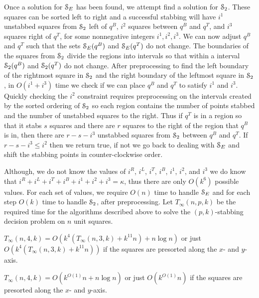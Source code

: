 \documentclass[11pt]{myclass}
\newcommand{\EuS}{\ensuremath{\EuScript{S}}}
\begin{document}
Once a solution for $\EuS_E$ has been found, we attempt find a solution for $\EuS_2$.  These squares can be sorted left to right and a successful stabbing will have $i^1$ unstabbed squares from $\EuS_2$ left of $q^B$, $i^2$ squares between $q^B$ and $q^T$, and $i^3$ squares right of $q^T$, for some nonnegative integers $i^1, i^2, i^3$.  We can now adjust $q^B$ and $q^T$ such that the sets $\EuS_E(q^B)$ and $\EuS_E(q^T)$ do not change.  The boundaries of the squares from $\EuS_2$ divide the regions into intervals so that within a interval $\EuS_2(q^B)$ and $\EuS_2(q^T)$ do not change.  After preprocessing to find the left boundary of the rightmost square in $\EuS_2$ and the right boundary of the leftmost square in $\EuS_2$, in $O(i^1 + i^3)$ time we check if we can place $q^B$ and $q^T$ to satisfy $i^1$ and $i^3$.  
Quickly checking the $i^2$ constraint requires preprocessing on the intervals created by the sorted ordering of $\EuS_2$ so each region contains the number of points stabbed and the number of unstabbed squares to the right.  Thus if $q^T$ is in a region so that it stabs $s$ squares and there are $r$ squares to the right of the region that $q^B$ is in, then there are $r - s - i^3$ unstabbed squares from $\EuS_2$ between $q^B$ and $q^T$.  If $r-s-i^3 \leq i^2$ then we return true, if not we go back to dealing with $\EuS_E$ and shift the stabbing points in counter-clockwise order.  

Although, we do not know the values of $i^R$, $i^L$, $i^T$, $i^B$, $i^1$, $i^2$, and $i^3$ we do know that $i^R + i^L + i^T + i^B + i^1 + i^2 + i^3 = \kappa$, thus there are only $O(k^6)$ possible values.  
For each set of values, we require $O(n)$ time to handle $\EuS_E$ and for each step $O(k)$ time to handle $\EuS_2$, after preprocessing.   
Let $T_\infty(n, p,k)$ be the required time for the algorithms described above to solve the $(p,k)$-stabbing decision problem on $n$ unit squares.  

\begin{lemma}
$T_\infty(n, 4, k) = O(k^4(T_\infty(n,3,k) + k^{11} n) + n \log n)$ or just $O(k^4(T_\infty(n,3,k) + k^{11} n))$ if the squares are presorted along the $x$- and $y$-axis.  
\end{lemma}

\begin{theorem}
$T_\infty(n, 4, k) = O(k^{O(1)} n + n \log n)$ or just $O(k^{O(1)}n)$ if the squares are presorted along the $x$- and $y$-axis.  
\label{thm:rect4-dec}
\end{theorem}
\end{document}
